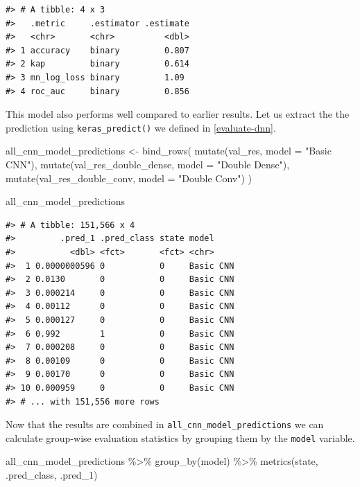 \documentclass[
]{krantz}
\makeatletter
\newenvironment{Shaded}{\begin{snugshade}}{\end{snugshade}}
\newcommand{\AttributeTok}[1]{\textcolor[rgb]{0.77,0.63,0.00}{#1}}
\newcommand{\FunctionTok}[1]{\textcolor[rgb]{0.00,0.00,0.00}{#1}}
\newcommand{\NormalTok}[1]{#1}
\newcommand{\OtherTok}[1]{\textcolor[rgb]{0.56,0.35,0.01}{#1}}
\newcommand{\SpecialCharTok}[1]{\textcolor[rgb]{0.00,0.00,0.00}{#1}}
\newcommand{\StringTok}[1]{\textcolor[rgb]{0.31,0.60,0.02}{#1}}
\newenvironment{kframe}{%
\medskip{}
\setlength{\fboxsep}{.8em}
 \def\at@end@of@kframe{}%
 \ifinner\ifhmode%
  \def\at@end@of@kframe{\end{minipage}}%
  \begin{minipage}{\columnwidth}%
 \fi\fi%
 \def\FrameCommand##1{\hskip\@totalleftmargin \hskip-\fboxsep
 \colorbox{shadecolor}{##1}\hskip-\fboxsep
     \hskip-\linewidth \hskip-\@totalleftmargin \hskip\columnwidth}%
 \MakeFramed {\advance\hsize-\width
   \@totalleftmargin\z@ \linewidth\hsize
   \@setminipage}}%
 {\par\unskip\endMakeFramed%
 \at@end@of@kframe}
\renewenvironment{Shaded}{\begin{kframe}}{\end{kframe}}
\makeatother
\begin{document}
\begin{verbatim}
#> # A tibble: 4 x 3
#>   .metric     .estimator .estimate
#>   <chr>       <chr>          <dbl>
#> 1 accuracy    binary         0.807
#> 2 kap         binary         0.614
#> 3 mn_log_loss binary         1.09 
#> 4 roc_auc     binary         0.856
\end{verbatim}

This model also performs well compared to earlier results. Let us extract the the prediction using \texttt{keras\_predict()} we defined in \ref{evaluate-dnn}.

\begin{Shaded}
\begin{Highlighting}[]
\NormalTok{all\_cnn\_model\_predictions }\OtherTok{\textless{}{-}} \FunctionTok{bind\_rows}\NormalTok{(}
  \FunctionTok{mutate}\NormalTok{(val\_res, }\AttributeTok{model =} \StringTok{"Basic CNN"}\NormalTok{),}
  \FunctionTok{mutate}\NormalTok{(val\_res\_double\_dense, }\AttributeTok{model =} \StringTok{"Double Dense"}\NormalTok{),}
  \FunctionTok{mutate}\NormalTok{(val\_res\_double\_conv, }\AttributeTok{model =} \StringTok{"Double Conv"}\NormalTok{)}
\NormalTok{)}

\NormalTok{all\_cnn\_model\_predictions}
\end{Highlighting}
\end{Shaded}

\begin{verbatim}
#> # A tibble: 151,566 x 4
#>         .pred_1 .pred_class state model    
#>           <dbl> <fct>       <fct> <chr>    
#>  1 0.0000000596 0           0     Basic CNN
#>  2 0.0130       0           0     Basic CNN
#>  3 0.000214     0           0     Basic CNN
#>  4 0.00112      0           0     Basic CNN
#>  5 0.000127     0           0     Basic CNN
#>  6 0.992        1           0     Basic CNN
#>  7 0.000208     0           0     Basic CNN
#>  8 0.00109      0           0     Basic CNN
#>  9 0.00170      0           0     Basic CNN
#> 10 0.000959     0           0     Basic CNN
#> # ... with 151,556 more rows
\end{verbatim}

Now that the results are combined in \texttt{all\_cnn\_model\_predictions} we can calculate group-wise evaluation statistics by grouping them by the \texttt{model} variable.

\begin{Shaded}
\begin{Highlighting}[]
\NormalTok{all\_cnn\_model\_predictions }\SpecialCharTok{\%\textgreater{}\%}
  \FunctionTok{group\_by}\NormalTok{(model) }\SpecialCharTok{\%\textgreater{}\%}
  \FunctionTok{metrics}\NormalTok{(state, .pred\_class, .pred\_1)}
\end{Highlighting}
\end{Shaded}
\end{document}

